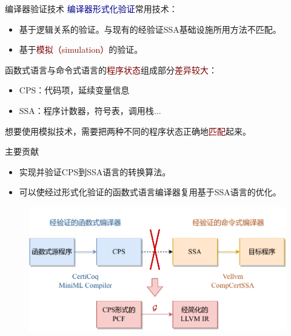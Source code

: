 \begin{frame}{编译器验证技术}
  \textcolor{DarkBlue}{编译器形式化验证}常用技术：
  \begin{itemize}
    \item 基于逻辑关系的验证。与现有的经验证SSA基础设施所用方法不匹配。
    \item 基于\textcolor{Maroon}{模拟（simulation）}的验证。
  \end{itemize}
  \vspace{2ex}
  函数式语言与命令式语言的\textcolor{Maroon}{程序状态}组成部分\textcolor{Maroon}{差异较大}：
  \begin{itemize}
    \item CPS：代码项，延续变量信息
    \item SSA：程序计数器，符号表，调用栈...
  \end{itemize}
  想要使用模拟技术，需要把两种不同的程序状态正确地\textcolor{Maroon}{匹配}起来。
\end{frame}

\begin{frame}{主要贡献}
  \begin{itemize}
    \item 实现并验证CPS到SSA语言的转换算法。
    \item 可以使经过形式化验证的函数式语言编译器复用基于SSA语言的优化。
  \end{itemize}
  \begin{figure}
    \centering
    \includegraphics[width=0.7\linewidth]{figures/partial.pdf}
    \label{fig:moti2}
  \end{figure}  
\end{frame}
